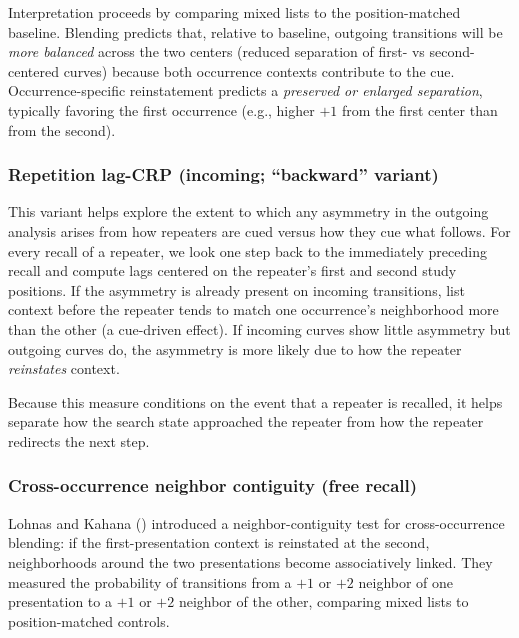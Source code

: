 \documentclass[
  man,
  floatsintext,
  longtable,
  nolmodern,
  notxfonts,
  notimes,
  draftfirst,
  colorlinks=true,linkcolor=blue,citecolor=blue,urlcolor=blue]{apa7}
\begin{document}
Interpretation proceeds by comparing mixed lists to the position-matched
baseline. Blending predicts that, relative to baseline, outgoing
transitions will be \emph{more balanced} across the two centers (reduced
separation of first- vs second-centered curves) because both occurrence
contexts contribute to the cue. Occurrence-specific reinstatement
predicts a \emph{preserved or enlarged separation}, typically favoring
the first occurrence (e.g., higher \(+1\) from the first center than
from the second).

\subsubsection{Repetition lag-CRP (incoming; ``backward''
variant)}\label{repetition-lag-crp-incoming-backward-variant}

This variant helps explore the extent to which any asymmetry in the
outgoing analysis arises from how repeaters are cued versus how they cue
what follows. For every recall of a repeater, we look one step back to
the immediately preceding recall and compute lags centered on the
repeater's first and second study positions. If the asymmetry is already
present on incoming transitions, list context before the repeater tends
to match one occurrence's neighborhood more than the other (a cue-driven
effect). If incoming curves show little asymmetry but outgoing curves
do, the asymmetry is more likely due to how the repeater
\emph{reinstates} context.

Because this measure conditions on the event that a repeater is
recalled, it helps separate how the search state approached the repeater
from how the repeater redirects the next step.

\subsubsection{Cross-occurrence neighbor contiguity (free
recall)}\label{cross-occurrence-neighbor-contiguity-free-recall}

Lohnas and Kahana () introduced
a neighbor-contiguity test for cross-occurrence blending: if the
first-presentation context is reinstated at the second, neighborhoods
around the two presentations become associatively linked. They measured
the probability of transitions from a \(+1\) or \(+2\) neighbor of one
presentation to a \(+1\) or \(+2\) neighbor of the other, comparing
mixed lists to position-matched controls.
\end{document}
